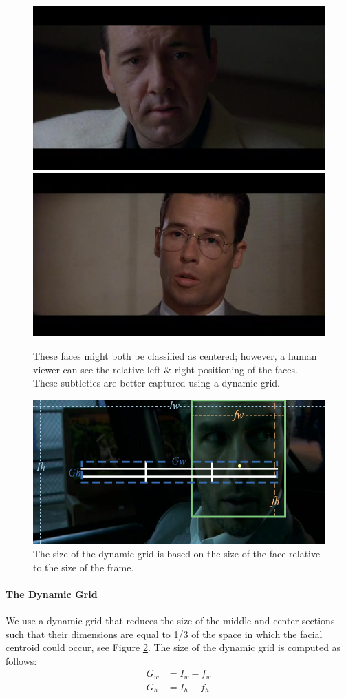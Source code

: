  \begin{figure}[tb]
\begin{center}
\includegraphics[width=0.49\linewidth]
    {fig/slightLeft.jpg}
\includegraphics[width=0.49\linewidth]
    {fig/slightRight.jpg}
\end{center}
\caption{These faces might both be classified as centered; however, a human viewer can see the relative left \& right positioning of the faces. These subtleties are better captured using a dynamic grid.}
\label{fig:leftRight}
\end{figure}

\begin{figure}[tb]
\begin{center}
\includegraphics[width=0.75\linewidth]
    {fig/dyGrid.jpg}
\end{center}
\caption{The size of the dynamic grid is based on the size of the face relative to the size of the frame.}
\label{fig:dyGrid}
\end{figure}

\paragraph{The Dynamic Grid}
We use a dynamic grid that  reduces the size of the middle and center sections such that their dimensions are equal to 1/3 of the space in which the facial centroid could occur, see Figure \ref{fig:dyGrid}. The size of the dynamic grid is computed as follows: 
\begin{eqnarray}
  G_{w} &= I_{w} - f_{w} \\
  G_{h} &= I_{h} - f_{h}
\end{eqnarray}

